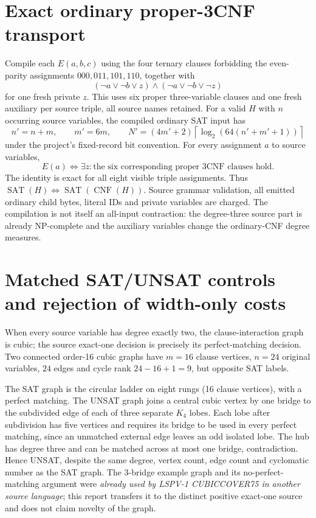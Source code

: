 \documentclass[11pt]{article}
\newcommand{\SAT}{\operatorname{SAT}}
\begin{document}
\section{Exact ordinary proper-3CNF transport}
Compile each \(E(a,b,c)\) using the four ternary clauses forbidding the even-parity assignments \(000,011,101,110\), together with
\[
 (\neg a\vee\neg b\vee z)\land(\neg a\vee\neg b\vee\neg z)
\]
for one fresh private \(z\). This uses six proper three-variable clauses and one fresh auxiliary per source triple, all source names retained. For a valid \(H\) with \(n\) occurring source variables, the compiled ordinary SAT input has
\[
 n'=n+m,\qquad m'=6m,\qquad
 N'=(4m'+2)\left\lceil\log_2(64(n'+m'+1))\right\rceil
\]
under the project's fixed-record bit convention. For every assignment \(a\) to source variables,
\[
 E(a)\iff\exists z:\text{the six corresponding proper 3CNF clauses hold}.
\]
The identity is exact for all eight visible triple assignments. Thus \(\SAT(H)\iff\SAT(\operatorname{CNF}(H))\). Source grammar validation, all emitted ordinary child bytes, literal IDs and private variables are charged. The compilation is not itself an all-input contraction: the degree-three source part is already NP-complete and the auxiliary variables change the ordinary-CNF degree measures.

\section{Matched SAT/UNSAT controls and rejection of width-only costs}
When every source variable has degree exactly two, the clause-interaction graph is cubic; the source exact-one decision is precisely its perfect-matching decision. Two connected order-16 cubic graphs have \(m=16\) clause vertices, \(n=24\) original variables, \(24\) edges and cycle rank \(24-16+1=9\), but opposite SAT labels.

The SAT graph is the circular ladder on eight rungs (16 clause vertices), with a perfect matching. The UNSAT graph joins a central cubic vertex by one bridge to the subdivided edge of each of three separate \(K_4\) lobes. Each lobe after subdivision has five vertices and requires its bridge to be used in every perfect matching, since an unmatched external edge leaves an odd isolated lobe. The hub has degree three and can be matched across at most one bridge, contradiction. Hence UNSAT, despite the same degree, vertex count, edge count and cyclomatic number as the SAT graph. The 3-bridge example graph and its no-perfect-matching argument were \emph{already used by LSPV-1 CUBICCOVER75 in another source language}; this report transfers it to the distinct positive exact-one source and does not claim novelty of the graph.
\end{document}
